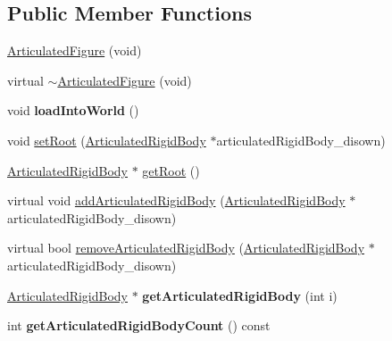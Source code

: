 \subsection*{Public Member Functions}
\begin{DoxyCompactItemize}
\item 
\hyperlink{classCartWheel_1_1Physics_1_1ArticulatedFigure_a26d393a08b33ae3d4b2cef1e9b5e9412}{ArticulatedFigure} (void)
\item 
virtual \hyperlink{classCartWheel_1_1Physics_1_1ArticulatedFigure_a69dbcd2796663a6c9821bb0ba43dd79c}{$\sim$ArticulatedFigure} (void)
\item 
\hypertarget{classCartWheel_1_1Physics_1_1ArticulatedFigure_a50db768178ff7c1870c5fe1d2891d7fe}{
void {\bfseries loadIntoWorld} ()}
\label{classCartWheel_1_1Physics_1_1ArticulatedFigure_a50db768178ff7c1870c5fe1d2891d7fe}

\item 
void \hyperlink{classCartWheel_1_1Physics_1_1ArticulatedFigure_a61090487a9da17a8eae1060e9bb817f9}{setRoot} (\hyperlink{classCartWheel_1_1Physics_1_1ArticulatedRigidBody}{ArticulatedRigidBody} $\ast$articulatedRigidBody\_\-disown)
\item 
\hyperlink{classCartWheel_1_1Physics_1_1ArticulatedRigidBody}{ArticulatedRigidBody} $\ast$ \hyperlink{classCartWheel_1_1Physics_1_1ArticulatedFigure_aee890ecb5f6b455e02b9a6632b76ef17}{getRoot} ()
\item 
virtual void \hyperlink{classCartWheel_1_1Physics_1_1ArticulatedFigure_a7d2ad78571d37e18d899e63a3b09aedd}{addArticulatedRigidBody} (\hyperlink{classCartWheel_1_1Physics_1_1ArticulatedRigidBody}{ArticulatedRigidBody} $\ast$articulatedRigidBody\_\-disown)
\item 
virtual bool \hyperlink{classCartWheel_1_1Physics_1_1ArticulatedFigure_ab21efa212cafec6ed5d1ae47bae2c059}{removeArticulatedRigidBody} (\hyperlink{classCartWheel_1_1Physics_1_1ArticulatedRigidBody}{ArticulatedRigidBody} $\ast$articulatedRigidBody\_\-disown)
\item 
\hypertarget{classCartWheel_1_1Physics_1_1ArticulatedFigure_a5f6edfc7039084dda23f423976831be0}{
\hyperlink{classCartWheel_1_1Physics_1_1ArticulatedRigidBody}{ArticulatedRigidBody} $\ast$ {\bfseries getArticulatedRigidBody} (int i)}
\label{classCartWheel_1_1Physics_1_1ArticulatedFigure_a5f6edfc7039084dda23f423976831be0}

\item 
\hypertarget{classCartWheel_1_1Physics_1_1ArticulatedFigure_a8a53b9e5cec42945fe8f2ad64bd4d138}{
int {\bfseries getArticulatedRigidBodyCount} () const }
\label{classCartWheel_1_1Physics_1_1ArticulatedFigure_a8a53b9e5cec42945fe8f2ad64bd4d138}


\end{DoxyCompactItemize}
